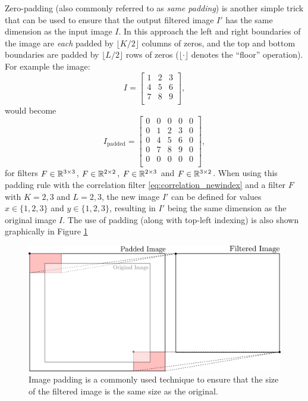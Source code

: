 \begin{example}
Zero-padding (also commonly referred to as \textit{same padding}) is another simple trick that can be used to ensure that the output filtered image $I'$ has the same dimension as the input image $I$. In this approach the left and right boundaries of the image are \textit{each} padded by $\lfloor K/2 \rfloor$ columns of zeros, and the top and bottom boundaries are padded by $\lfloor L/2 \rfloor$ rows of zeros ($\lfloor \cdot \rfloor$ denotes the ``floor'' operation). For example the image:
\begin{equation*}
I = \begin{bmatrix}
    1 & 2 & 3 \\
    4 & 5 & 6 \\
    7 & 8 & 9 \\
    \end{bmatrix},
\end{equation*}
would become
\begin{equation*}
I_\text{padded} = \begin{bmatrix}
    0 & 0 & 0 & 0 & 0 \\
    0 & 1 & 2 & 3 & 0 \\
    0 & 4 & 5 & 6 & 0 \\
    0 & 7 & 8 & 9 & 0 \\
    0 & 0 & 0 & 0 & 0 \\
    \end{bmatrix},
\end{equation*}
for filters $F \in \mathbb{R}^{3\times 3}$, $F \in \mathbb{R}^{2 \times 2}$, $F \in \mathbb{R}^{2 \times 3}$ and $F \in \mathbb{R}^{3 \times 2}$. When using this padding rule with the correlation filter \eqref{eq:correlation_newindex} and a filter $F$ with $K = 2,3$ and $L= 2,3$, the new image $I'$ can be defined for values $x \in \{1,2,3\}$ and $y \in \{1,2,3\}$, resulting in $I'$ being the same dimension as the original image $I$. The use of padding (along with top-left indexing) is also shown graphically in Figure \ref{fig:paddingfilter}
\begin{figure}[ht]
  \centering
  \includegraphics[width=.7\textwidth]{tex/figs/ch11_figs/topleftfilter_padding.png}
    \caption{Image padding is a commonly used technique to ensure that the size of the filtered image is the same size as the original.}
    \label{fig:paddingfilter}
\end{figure}
\end{example}


